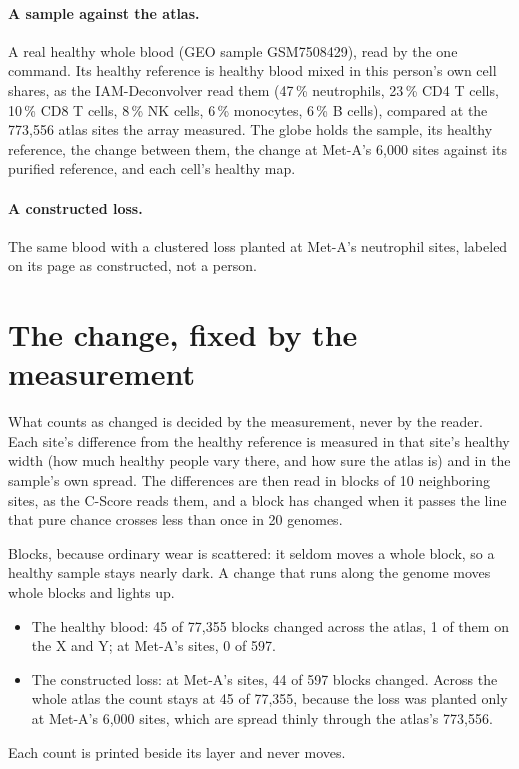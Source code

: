 \paragraph{A sample against the atlas.} A real healthy whole blood (GEO sample GSM7508429), read by the one command. Its healthy
reference is healthy blood mixed in this person's own cell shares, as the IAM-Deconvolver read them (47\,\% neutrophils, 23\,\% CD4 T
cells, 10\,\% CD8 T cells, 8\,\% NK cells, 6\,\% monocytes, 6\,\% B cells), compared at the 773{,}556 atlas sites the array measured.
The globe holds the sample, its healthy reference, the change between them, the change at Met-A's 6{,}000 sites against its purified
reference, and each cell's healthy map.

\paragraph{A constructed loss.} The same blood with a clustered loss planted at Met-A's neutrophil sites, labeled on its page as
constructed, not a person.

\section{The change, fixed by the measurement}

What counts as changed is decided by the measurement, never by the reader. Each site's difference from the healthy reference is
measured in that site's healthy width (how much healthy people vary there, and how sure the atlas is) and in the sample's own spread.
The differences are then read in blocks of 10 neighboring sites, as the C-Score reads them, and a block has changed when it passes the
line that pure chance crosses less than once in 20 genomes.

Blocks, because ordinary wear is scattered: it seldom moves a whole block, so a healthy sample stays nearly dark. A change that runs
along the genome moves whole blocks and lights up.

\begin{itemize}
\item The healthy blood: 45 of 77{,}355 blocks changed across the atlas, 1 of them on the X and Y; at Met-A's sites, 0 of 597.
\item The constructed loss: at Met-A's sites, 44 of 597 blocks changed. Across the whole atlas the count stays at 45 of 77{,}355,
because the loss was planted only at Met-A's 6{,}000 sites, which are spread thinly through the atlas's 773{,}556.
\end{itemize}
Each count is printed beside its layer and never moves.


